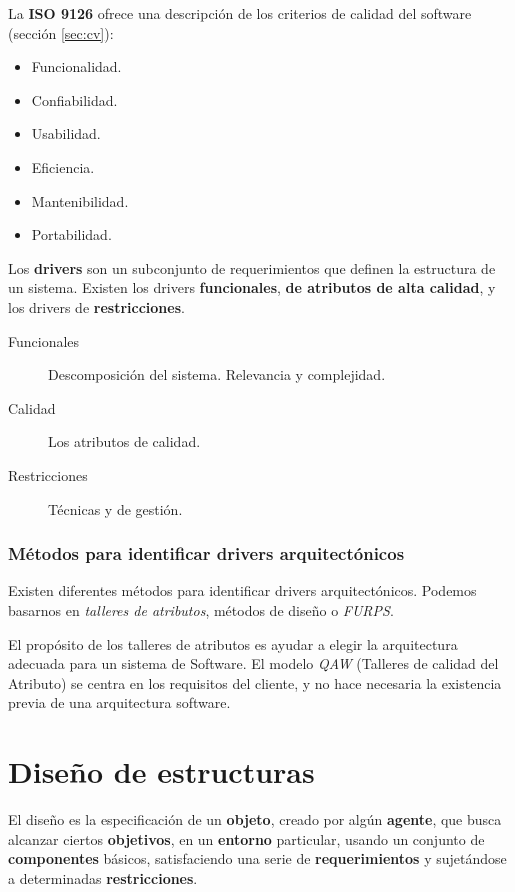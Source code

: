 La \textbf{ISO 9126} ofrece una descripción de los criterios de
calidad del software (sección \ref{sec:cv}):

\begin{itemize}[noitemsep]
\item Funcionalidad.
\item Confiabilidad.
\item Usabilidad.
\item Eficiencia.
\item Mantenibilidad.
\item Portabilidad.
\end{itemize}

Los \textbf{drivers} son un subconjunto de requerimientos que definen
la estructura de un sistema. Existen los drivers \textbf{funcionales},
\textbf{de atributos de alta calidad}, y los drivers de
\textbf{restricciones}.

\begin{description}
\item[Funcionales] Descomposición del sistema. Relevancia y
  complejidad.
\item[Calidad] Los atributos de calidad.
\item[Restricciones] Técnicas y de gestión.
\end{description}
\label{sec:drivers}

\subsubsection{Métodos para identificar drivers arquitectónicos}
\label{sec:drivers}

Existen diferentes métodos para identificar drivers
arquitectónicos. Podemos basarnos en \emph{talleres de atributos},
métodos de diseño o \emph{FURPS}.

El propósito de los talleres de atributos es ayudar a elegir la
arquitectura adecuada para un sistema de Software. El modelo
\emph{QAW} (Talleres de calidad del Atributo) se centra en los
requisitos del cliente, y no hace necesaria la existencia previa de
una arquitectura software.

\section{Diseño de estructuras}
\label{sec:arquitectura:diseñoestructura}

El diseño es la especificación de un \textbf{objeto}, creado por algún
\textbf{agente}, que busca alcanzar ciertos \textbf{objetivos}, en un
\textbf{entorno} particular, usando un conjunto de
\textbf{componentes} básicos, satisfaciendo una serie de
\textbf{requerimientos} y sujetándose a determinadas
\textbf{restricciones}.

